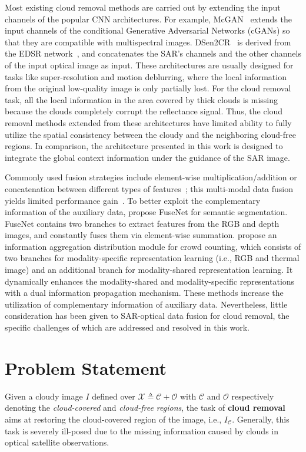 \documentclass[a4paper,fleqn]{cas-dc}
\newcommand{\ie}[1]{{i.e.}}
\begin{document}
Most existing cloud removal methods are carried out by extending the input channels of the popular CNN architectures. For example, McGAN~\citep{enomoto2017filmy} extends the input channels of the conditional Generative Adversarial Networks (cGANs) so that they are compatible with multispectral images. DSen2CR~\citep{meraner2020cloud} is derived from the EDSR network~\citep{lim2017enhanced}, and concatenates the SAR's channels and the other channels of the input optical image as input. These architectures are usually designed for tasks like super-resolution and motion deblurring, where the local information from the original low-quality image is only partially lost. For the cloud removal task, all the local information in the area covered by thick clouds is missing because the clouds completely corrupt the reflectance signal. Thus, the cloud removal methods extended from these architectures have limited ability to fully utilize the spatial consistency between the cloudy and the neighboring cloud-free regions. 
In comparison, the architecture presented in this work is designed to integrate the global context information under the guidance of the SAR image.


Commonly used fusion strategies include element-wise multiplication/addition or concatenation between different types of features~\citep{sun2019leveraging, fu2020jl, xu2021motion}; this multi-modal data fusion yields limited performance gain~\citep{wu2018multi, audebert2018beyond, liu2021cross}.
To better exploit the complementary information of the auxiliary data, \cite{hazirbas2016fusenet} propose FuseNet for semantic segmentation. FuseNet contains two branches to extract features from the RGB and depth images, and constantly fuses them via element-wise summation. \cite{liu2021cross} propose an information aggregation distribution module for crowd counting, which consists of two branches for modality-specific representation learning (\ie{}, RGB and thermal image) and an additional branch for modality-shared representation learning. It dynamically enhances the modality-shared and modality-specific representations with a dual information propagation mechanism. These methods increase the utilization of complementary information of auxiliary data. Nevertheless, little consideration has been given to SAR-optical data fusion for cloud removal, the specific challenges of which are addressed and resolved in this work.


\section{Problem Statement}
Given a cloudy image $I$ defined over $\mathcal{X}\triangleq \mathcal{C} + \mathcal{O}$ with $\mathcal{C}$ and $\mathcal{O}$ respectively denoting the {\it cloud-covered} and {\it cloud-free regions}, the task of {\bf cloud removal} aims at restoring the cloud-covered region of the image, \ie{}, $I_{\mathcal{C}}$. Generally, this task is severely ill-posed due to the missing information caused by clouds in optical satellite observations.
\end{document}
